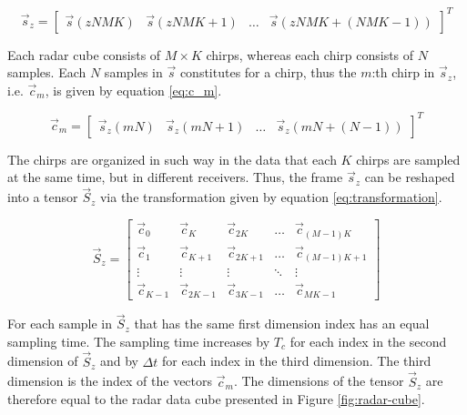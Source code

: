 \begin{equation}
    \label{eq:z-samples}
    \vec{s}_{z} = \begin{bmatrix} \vec{s}(zNMK) & \vec{s}(zNMK+1) & \ldots & \vec{s}(zNMK+(NMK-1)) \end{bmatrix} ^{T}
\end{equation}

Each radar cube consists of $M \times K$ chirps, whereas each chirp consists of $N$ samples.
Each $N$ samples in $\vec{s}$ constitutes for a chirp, thus the $m$:th chirp in $\vec{s}_{z}$, i.e. $\vec{c}_{m}$, is given by equation \ref{eq:c_m}.

\begin{equation}
    \label{eq:c_m}
    \vec{c}_{m} = \begin{bmatrix} \vec{s}_{z}(mN) & \vec{s}_{z}(mN+1) & \ldots & \vec{s}_{z}(mN+(N-1))  \end{bmatrix} ^T
\end{equation}

The chirps are organized in such way in the data that each $K$ chirps are sampled at the same time,
but in different receivers.
Thus, the frame $\vec{s}_{z}$ can be reshaped into a tensor $\vec{S}_{z}$ via the transformation given by equation \ref{eq:transformation}.

\begin{equation}
    \label{eq:transformation}
    \vec{S}_{z} =
        \begin{bmatrix}
            \vec{c}_{0}   & \vec{c}_{K}    & \vec{c}_{2K} & \ldots & \vec{c}_{(M-1)K}   \\
            \vec{c}_{1}   & \vec{c}_{K+1}  & \vec{c}_{2K+1} & \ldots & \vec{c}_{(M-1)K+1} \\
            \vdots        & \vdots         & \vdots       & \ddots & \vdots             \\
            \vec{c}_{K-1} & \vec{c}_{2K-1} & \vec{c}_{3K-1} & \ldots & \vec{c}_{MK-1}
        \end{bmatrix}
\end{equation}

For each sample in $\vec{S}_z$ that has the same first dimension index has an equal sampling time.
The sampling time increases by $T_c$ for each index in the second dimension of $\vec{S}_z$ and 
by $\Delta t$ for each index in the third dimension.
The third dimension is the index of the vectors $\vec{c}_m$.
The dimensions of the tensor $\vec{S}_z$ are therefore equal to the radar data cube presented in Figure \ref{fig:radar-cube}.

